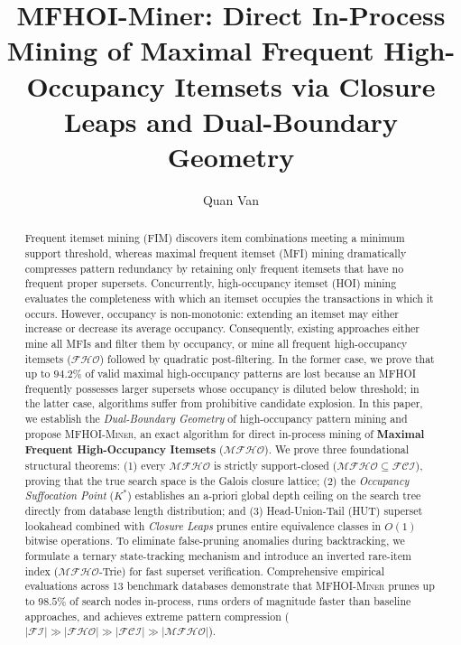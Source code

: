 \documentclass[runningheads,orivec]{llncs}
\newcommand{\FI}{\ensuremath{\mathcal{FI}}}
\newcommand{\FHO}{\ensuremath{\mathcal{FHO}}}
\newcommand{\FCI}{\ensuremath{\mathcal{FCI}}}
\newcommand{\MFHO}{\ensuremath{\mathcal{MFHO}}}
\newcommand{\MFHOI}{\ensuremath{\mathcal{MFHO}}}
\newcommand{\MFHOIMiner}{\textsc{MFHOI-Miner}}
\begin{document}
\title{MFHOI-Miner: Direct In-Process Mining of Maximal Frequent High-Occupancy Itemsets via Closure Leaps and Dual-Boundary Geometry}

\author{Quan Van}


\maketitle

\begin{abstract}
Frequent itemset mining (FIM) discovers item combinations meeting a minimum support threshold, whereas maximal frequent itemset (MFI) mining dramatically compresses pattern redundancy by retaining only frequent itemsets that have no frequent proper supersets. Concurrently, high-occupancy itemset (HOI) mining evaluates the completeness with which an itemset occupies the transactions in which it occurs. However, occupancy is non-monotonic: extending an itemset may either increase or decrease its average occupancy. Consequently, existing approaches either mine all MFIs and filter them by occupancy, or mine all frequent high-occupancy itemsets ($\FHO$) followed by quadratic post-filtering. In the former case, we prove that up to $94.2\%$ of valid maximal high-occupancy patterns are lost because an MFHOI frequently possesses larger supersets whose occupancy is diluted below threshold; in the latter case, algorithms suffer from prohibitive candidate explosion.
In this paper, we establish the \emph{Dual-Boundary Geometry} of high-occupancy pattern mining and propose \MFHOIMiner{}, an exact algorithm for direct in-process mining of \textbf{Maximal Frequent High-Occupancy Itemsets} ($\MFHOI$). We prove three foundational structural theorems: (1) every $\MFHOI$ is strictly support-closed ($\MFHOI \subseteq \FCI$), proving that the true search space is the Galois closure lattice; (2) the \emph{Occupancy Suffocation Point} ($K^*$) establishes an a-priori global depth ceiling on the search tree directly from database length distribution; and (3) Head-Union-Tail (HUT) superset lookahead combined with \emph{Closure Leaps} prunes entire equivalence classes in $O(1)$ bitwise operations. To eliminate false-pruning anomalies during backtracking, we formulate a ternary state-tracking mechanism and introduce an inverted rare-item index (\MFHO{}-Trie) for fast superset verification. Comprehensive empirical evaluations across 13 benchmark databases demonstrate that \MFHOIMiner{} prunes up to $98.5\%$ of search nodes in-process, runs orders of magnitude faster than baseline approaches, and achieves extreme pattern compression ($\vert\FI\vert \gg \vert\FHO\vert \gg \vert\FCI\vert \gg \vert\MFHOI\vert$).

\end{abstract}
\end{document}
